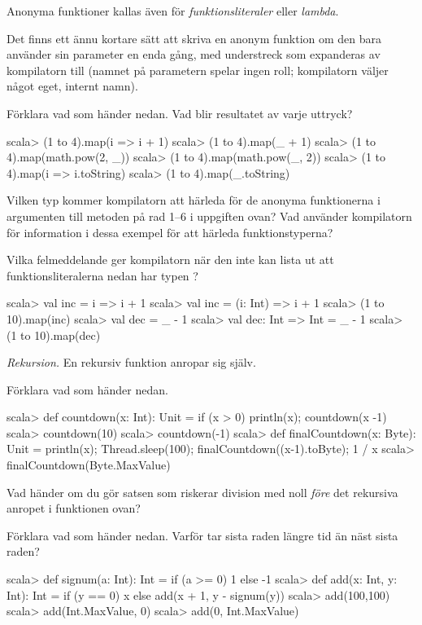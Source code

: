 Anonyma funktioner kallas även för \emph{funktionsliteraler} eller \emph{lambda}.

Det finns ett ännu kortare sätt att skriva en anonym funktion om den bara använder sin parameter en enda gång, med understreck  som expanderas av kompilatorn till  (namnet på parametern spelar ingen roll; kompilatorn väljer något eget, internt namn). 

\Subtask Förklara vad som händer nedan. Vad blir resultatet av varje uttryck?

\begin{REPL}
scala> (1 to 4).map(i => i + 1)
scala> (1 to 4).map(_ + 1)
scala> (1 to 4).map(math.pow(2, _))
scala> (1 to 4).map(math.pow(_, 2))
scala> (1 to 4).map(i => i.toString)
scala> (1 to 4).map(_.toString)
\end{REPL}

\Subtask\Pen Vilken typ kommer kompilatorn att härleda för de anonyma funktionerna i argumenten till metoden  på rad 1--6 i uppgiften ovan? Vad använder kompilatorn för information i dessa exempel för att härleda funktionstyperna?

\Subtask\Pen Vilka felmeddelande ger kompilatorn när den inte kan lista ut att funktionsliteralerna nedan har typen ?

\begin{REPL}
scala> val inc = i => i + 1
scala> val inc = (i: Int) => i + 1
scala> (1 to 10).map(inc)
scala> val dec = _ - 1 
scala> val dec: Int => Int = _ - 1
scala> (1 to 10).map(dec)
\end{REPL}



\Task \emph{Rekursion.} En rekursiv funktion anropar sig själv.

\Subtask Förklara vad som händer nedan. 

\begin{REPL}
scala> def countdown(x: Int): Unit = if (x > 0) {println(x); countdown(x -1)}
scala> countdown(10)
scala> countdown(-1)
scala> def finalCountdown(x: Byte): Unit = 
         {println(x); Thread.sleep(100); finalCountdown((x-1).toByte); 1 / x}
scala> finalCountdown(Byte.MaxValue)
\end{REPL}

\Subtask Vad händer om du gör satsen som riskerar division med noll \emph{före} det rekursiva anropet i funktionen  ovan?

\Subtask Förklara vad som händer nedan. Varför tar sista raden längre tid än näst sista raden?
\begin{REPL}
scala> def signum(a: Int): Int = if (a >= 0) 1 else -1 
scala> def add(x: Int, y: Int): Int = 
         if (y == 0) x else add(x + 1, y - signum(y))
scala> add(100,100)
scala> add(Int.MaxValue, 0)
scala> add(0, Int.MaxValue)
\end{REPL}



